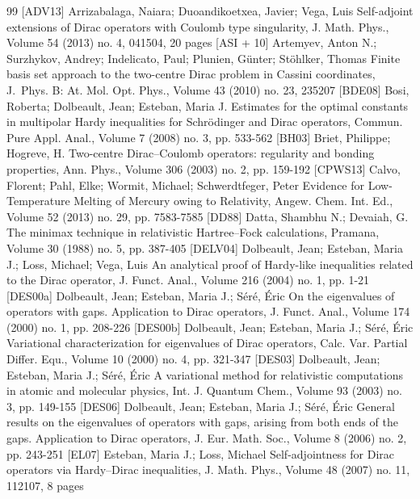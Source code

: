 \begin{thebibliography}{99}
 [ADV13] Arrizabalaga, Naiara; Duoandikoetxea, Javier; Vega, Luis Self-adjoint extensions of Dirac operators with Coulomb type singularity, J. Math. Phys., Volume 54 (2013) no. 4, 041504, 20 pages
 [ASI + 10] Artemyev, Anton N.; Surzhykov, Andrey; Indelicato, Paul; Plunien, Günter; Stöhlker, Thomas Finite basis set approach to the two-centre Dirac problem in Cassini coordinates, J. Phys. B: At. Mol. Opt. Phys., Volume 43 (2010) no. 23, 235207
 [BDE08] Bosi, Roberta; Dolbeault, Jean; Esteban, Maria J. Estimates for the optimal constants in multipolar Hardy inequalities for Schrödinger and Dirac operators, Commun. Pure Appl. Anal., Volume 7 (2008) no. 3, pp. 533-562
 [BH03] Briet, Philippe; Hogreve, H. Two-centre Dirac–Coulomb operators: regularity and bonding properties, Ann. Phys., Volume 306 (2003) no. 2, pp. 159-192
 [CPWS13] Calvo, Florent; Pahl, Elke; Wormit, Michael; Schwerdtfeger, Peter Evidence for Low-Temperature Melting of Mercury owing to Relativity, Angew. Chem. Int. Ed., Volume 52 (2013) no. 29, pp. 7583-7585
 [DD88] Datta, Shambhu N.; Devaiah, G. The minimax technique in relativistic Hartree–Fock calculations, Pramana, Volume 30 (1988) no. 5, pp. 387-405
 [DELV04] Dolbeault, Jean; Esteban, Maria J.; Loss, Michael; Vega, Luis An analytical proof of Hardy-like inequalities related to the Dirac operator, J. Funct. Anal., Volume 216 (2004) no. 1, pp. 1-21
 [DES00a] Dolbeault, Jean; Esteban, Maria J.; Séré, Éric On the eigenvalues of operators with gaps. Application to Dirac operators, J. Funct. Anal., Volume 174 (2000) no. 1, pp. 208-226
 [DES00b] Dolbeault, Jean; Esteban, Maria J.; Séré, Éric Variational characterization for eigenvalues of Dirac operators, Calc. Var. Partial Differ. Equ., Volume 10 (2000) no. 4, pp. 321-347
 [DES03] Dolbeault, Jean; Esteban, Maria J.; Séré, Éric A variational method for relativistic computations in atomic and molecular physics, Int. J. Quantum Chem., Volume 93 (2003) no. 3, pp. 149-155
 [DES06] Dolbeault, Jean; Esteban, Maria J.; Séré, Éric General results on the eigenvalues of operators with gaps, arising from both ends of the gaps. Application to Dirac operators, J. Eur. Math. Soc., Volume 8 (2006) no. 2, pp. 243-251
 [EL07] Esteban, Maria J.; Loss, Michael Self-adjointness for Dirac operators via Hardy–Dirac inequalities, J. Math. Phys., Volume 48 (2007) no. 11, 112107, 8 pages

\end{thebibliography}
